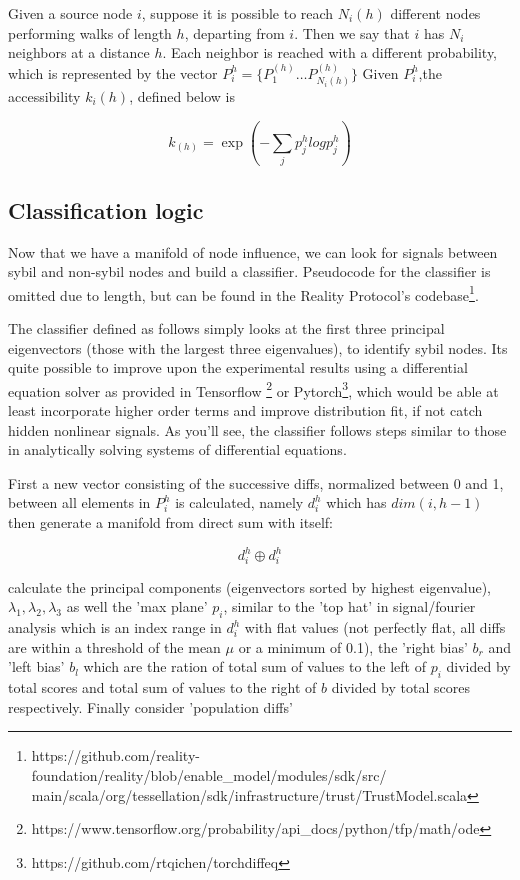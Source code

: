 \documentclass{article}
\begin{document}
Given a source node $i$, suppose it is possible to reach $N_i(h)$ different nodes performing walks of length $h$, departing from $i$. Then we say that $i$ has $N_i$ neighbors at a distance $h$. Each neighbor is reached with a different probability, which is represented by the vector $P_i^h = \{ P_1^{(h)} \dots P_{N_i(h)}^{(h)} \}$ Given $P_i^h$,the accessibility $k_i(h)$, defined below is 
	
	
\begin{equation}
k_(h) = \exp (-\sum_j p^{h}_j log p^{h}_j )
\end{equation}

\subsection{Classification logic}
Now  that we have a manifold of node influence, we can look for signals between sybil and non-sybil nodes and build a classifier. Pseudocode for the classifier is omitted due to length, but can be found in the Reality Protocol's codebase\footnote{https://github.com/reality-foundation/reality/blob/enable\_model/modules/sdk/src/\\main/scala/org/tessellation/sdk/infrastructure/trust/TrustModel.scala}.

The classifier defined as follows simply looks at the first three principal eigenvectors (those with the largest three eigenvalues), to identify sybil nodes. Its quite possible to improve upon the experimental results using a differential equation solver as provided in Tensorflow \footnote{https://www.tensorflow.org/probability/api\_docs/python/tfp/math/ode} or Pytorch\footnote{https://github.com/rtqichen/torchdiffeq}, which would be able at least incorporate higher order terms and improve distribution fit, if not catch hidden nonlinear signals. As you'll see, the classifier follows steps similar to those in analytically solving systems of differential equations.

First a new vector consisting of the successive diffs, normalized between 0 and 1, between all elements in $P_i^h$ is calculated, namely $d_i^h$ which has $dim(i, h-1)$ then generate a manifold from direct sum with itself:

\begin{equation}
d_i^h \oplus d_i^h
\end{equation}

calculate the principal components (eigenvectors sorted by highest eigenvalue), $\lambda_1, \lambda_2 ,\lambda_3$ as well the 'max plane' $p_i$, similar to the 'top hat' in signal/fourier analysis which is an index range in $d_i^h$ with flat values (not perfectly flat, all diffs are within a threshold of the mean $\mu$ or a minimum of 0.1), the 'right bias' $b_r$ and 'left bias' $b_l$ which are the ration of total sum of values to the left of $p_i$ divided by total scores and  total sum of values to the right of $b$ divided by total scores respectively. Finally consider 'population diffs' 
\end{document}
